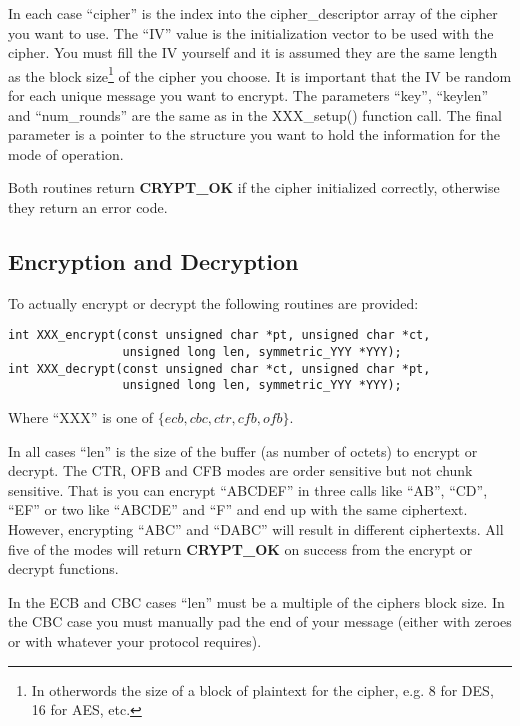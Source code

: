 \documentclass[a4paper]{book}
\begin{document}
In each case ``cipher'' is the index into the cipher\_descriptor array of the cipher you want to use.  The ``IV'' value is 
the initialization vector to be used with the cipher.  You must fill the IV yourself and it is assumed they are the same 
length as the block size\footnote{In otherwords the size of a block of plaintext for the cipher, e.g. 8 for DES, 16 for AES, etc.} 
of the cipher you choose.  It is important that the IV  be random for each unique message you want to encrypt.  The 
parameters ``key'', ``keylen'' and ``num\_rounds'' are the same as in the XXX\_setup() function call.  The final parameter 
is a pointer to the structure you want to hold the information for the mode of operation.

Both routines return {\bf CRYPT\_OK} if the cipher initialized correctly, otherwise they return an error code.  

\subsection{Encryption and Decryption}
To actually encrypt or decrypt the following routines are provided:
    
     
\begin{verbatim}
int XXX_encrypt(const unsigned char *pt, unsigned char *ct, 
                unsigned long len, symmetric_YYY *YYY);
int XXX_decrypt(const unsigned char *ct, unsigned char *pt, 
                unsigned long len, symmetric_YYY *YYY);
\end{verbatim}
Where ``XXX'' is one of $\lbrace ecb, cbc, ctr, cfb, ofb \rbrace$.  

In all cases ``len'' is the size of the buffer (as number of octets) to encrypt or decrypt.  The CTR, OFB and CFB modes are order sensitive but not
chunk sensitive.  That is you can encrypt ``ABCDEF'' in three calls like ``AB'', ``CD'', ``EF'' or two like ``ABCDE'' and ``F''
and end up with the same ciphertext.  However, encrypting ``ABC'' and ``DABC'' will result in different ciphertexts.  All
five of the modes will return {\bf CRYPT\_OK} on success from the encrypt or decrypt functions.

In the ECB and CBC cases ``len'' must be a multiple of the ciphers block size.  In the CBC case you must manually pad the end of your message (either with
zeroes or with whatever your protocol requires).
\end{document}
